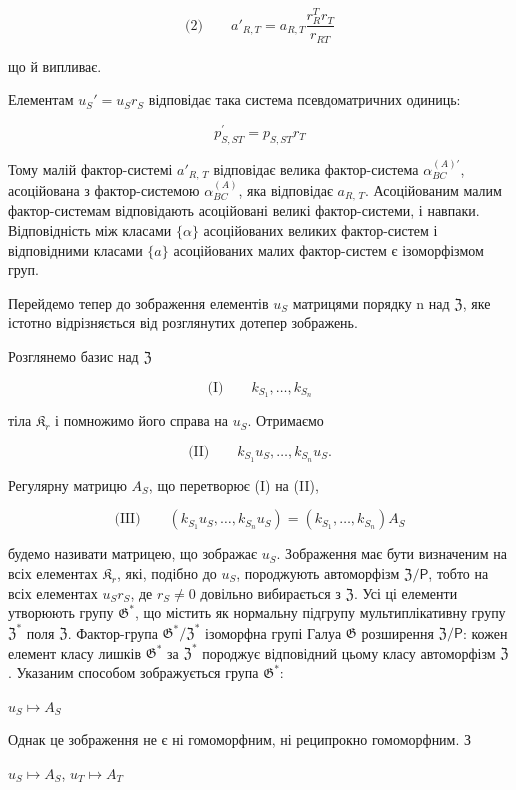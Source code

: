 \documentclass[11pt]{article}
\begin{document}
\[
\text{(2)}\qquad a'_{R,T}=a_{R,T}\frac{r_R^T r_T}{r_{RT}}
\]

що й випливає.

Елементам \(u_S' = u_S r_S\) відповідає така система псевдоматричних одиниць:

\[p_{S,ST}^{\prime}=p_{S,ST}r_{T}\]

Тому малій фактор-системі \(a'_{R,\,T}\) відповідає велика фактор-система \(\alpha^{(A)\prime}_{BC}\), асоційована з фактор-системою \(\alpha^{(A)}_{BC}\), яка відповідає \(a_{R,\,T}\). Асоційованим малим фактор-системам відповідають асоційовані великі фактор-системи, і навпаки. Відповідність між класами \(\{\alpha\}\) асоційованих великих фактор-систем і відповідними класами \(\{a\}\) асоційованих малих фактор-систем є ізоморфізмом груп.

Перейдемо тепер до зображення елементів \(u_S\) матрицями порядку n над \(\mathfrak{Z}\), яке істотно відрізняється від розглянутих дотепер зображень.

Розглянемо базис над \(\mathfrak Z\)

\[
\text{(I)}\qquad k_{S_1}, \ldots, k_{S_n}
\]

тіла \(\mathfrak K_r\) і помножимо його справа на \(u_S\). Отримаємо

\[
\text{(II)}\qquad k_{S_1}u_S, \ldots, k_{S_n}u_S.
\]

Регулярну матрицю \(A_S\), що перетворює (I) на (II),

\[
\text{(III)}\qquad (k_{S_1}u_S, \ldots, k_{S_n}u_S) = (k_{S_1}, \ldots, k_{S_n})A_S
\]

будемо називати матрицею, що зображає \(u_S\). Зображення має бути визначеним на всіх елементах \(\mathfrak K_{r}\), які, подібно до \(u_S\), породжують автоморфізм \(\mathfrak Z/\mathsf{P}\), тобто на всіх елементах \(u_Sr_S\), де \(r_S \neq 0\) довільно вибирається з \(\mathfrak Z\). Усі ці елементи утворюють групу \(\mathfrak G^*\), що містить як нормальну підгрупу мультиплікативну групу \(\mathfrak Z^*\) поля \(\mathfrak Z\). Фактор-група \(\mathfrak G^*/\mathfrak Z^*\) ізоморфна групі Галуа \(\mathfrak G\) розширення \(\mathfrak Z/\mathsf{P}\): кожен елемент класу лишків \(\mathfrak G^*\) за \(\mathfrak Z^*\) породжує відповідний цьому класу автоморфізм \(\mathfrak Z\). Указаним способом зображується група \(\mathfrak G^*\):

\(u_S \mapsto A_S\)

Однак це зображення не є ні гомоморфним, ні реципрокно гомоморфним. З

\(u_S \mapsto A_S\), \(u_T \mapsto A_T\)
\end{document}
